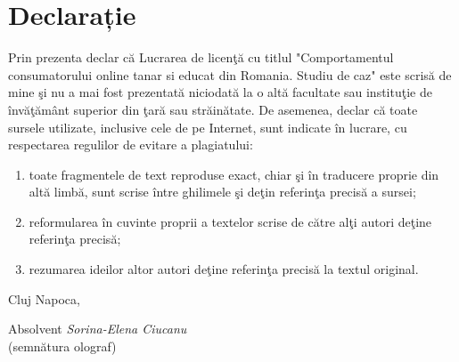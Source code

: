 \documentclass[a4paper, 12pt]{article}
\begin{document}
\restoregeometry
\thispagestyle{empty}
\section*{Declarație}
\bigskip
\qquad Prin prezenta declar că Lucrarea de licenţă cu titlul "Comportamentul consumatorului online tanar si educat din Romania. Studiu de caz" este scrisă de mine şi nu a mai fost prezentată niciodată la o altă facultate sau instituţie de învăţământ superior din ţară sau străinătate. De asemenea, declar că toate sursele utilizate, inclusive cele de pe Internet, sunt indicate în lucrare, cu respectarea regulilor de evitare a plagiatului:
\begin{enumerate}[-]
	\item toate fragmentele de text reproduse exact, chiar şi în traducere proprie din altă limbă, sunt scrise între ghilimele şi deţin referinţa precisă a sursei;
	\item reformularea în cuvinte proprii a textelor scrise de către alţi autori deţine referinţa precisă;
	\item rezumarea ideilor altor autori deţine referinţa precisă la textul original.
\end{enumerate}

\vspace{3 cm}
\begin{flushleft}
	\large Cluj Napoca,
\end{flushleft}


\begin{flushright}
	\hfill \large Absolvent \textit{Sorina-Elena Ciucanu} \\
	\hfill \large {(semnătura olograf)}
\end{flushright}
\newpage
\thispagestyle{empty}
\tableofcontents
\thispagestyle{empty}
\newpage
\thispagestyle{empty}
\listoffigures
\newpage
\thispagestyle{empty}
\listoftables

\newpage
\end{document}
